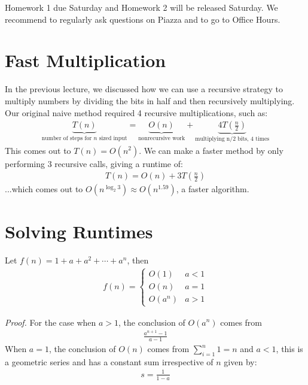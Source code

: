 \documentclass[14pt]{extarticle}
\begin{document}
	\MakeScribeTop

    Homework 1 due Saturday and Homework 2 will be released Saturday. We 
    recommend to regularly ask questions on Piazza and to go to Office Hours.

    \section{Fast Multiplication}
    In the previous lecture, we discussed how we can use a recursive
    strategy to multiply numbers by dividing the bits in half and then
    recursively multiplying.\\

    Our original naive method required 4 recursive multiplications, such as:
    \begin{align*}
        \underbrace{T(n)}_{\text{number of steps for $n$ sized input}}
        = \underbrace{O(n)}_{\text{nonrecursive work}}
        + 
        \underbrace{4T\left(\frac{n}{2}\right)}_{\text{multiplying n/2 bits, 4
        times}}
    \end{align*}
    This comes out to $T(n) = O(n^2)$. We can make a faster method by only
    performing 3 recursive calls, giving a runtime of:
    \begin{align*}
        T(n) = O(n) + 3T\left(\frac{n}{2}\right)
    \end{align*}
    ...which comes out to $O(n^{\log_2 3}) \approx O(n^{1.59})$, a faster
    algorithm.

    \section{Solving Runtimes}
    \begin{lemma}
        Let $f(n) = 1 + a + a^2 + \cdots + a^n$, then
        \begin{align*}
            f(n) = \begin{cases}
                O(1)    & a < 1    \\
                O(n)    & a = 1    \\
                O(a^n)  & a > 1
            \end{cases}
        \end{align*}
    \end{lemma}
    \textit{Proof.} For the case when $a > 1$, the conclusion of $O(a^n)$
    comes from
    \begin{align*}
        \frac{a^{n + 1} - 1}{a - 1}
    \end{align*}
    When $a = 1$, the conclusion of $O(n)$ comes from $\sum_{i = 1}^n 1 = n$
    and $a < 1$, this is a geometric series and has a constant sum 
    irrespective of $n$ given by:
    \begin{align*}
        s = \frac{1}{1 - a}
    \end{align*}
\end{document}
